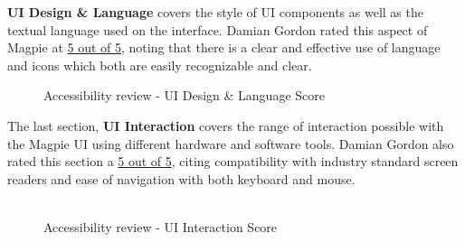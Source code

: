 \newpage
\noindent \textbf{UI Design \& Language} covers the style of UI components as well as the textual language used on the interface. Damian Gordon rated this aspect of Magpie at \underline{5 out of 5}, noting that there is a clear and effective use of language and icons which both are easily recognizable and clear.
\begin{figure}
    \centering
    \caption{Accessibility review - UI Design \& Language Score}
\end{figure}

\newpage
\noindent The last section, \textbf{UI Interaction} covers the range of interaction possible with the Magpie UI using different hardware and software tools. Damian Gordon also rated this section a \underline{5 out of 5}, citing compatibility with industry standard screen readers and ease of navigation with both keyboard and mouse.\\\\
\begin{figure}
    \centering
    \caption{Accessibility review - UI Interaction Score}
\end{figure}

